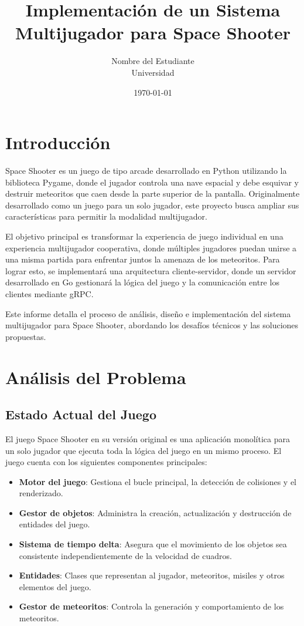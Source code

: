\documentclass[12pt,letterpaper]{article}
\title{\textbf{Implementación de un Sistema Multijugador para Space Shooter}}
\author{Nombre del Estudiante \\ Universidad}
\date{\today}
\begin{document}
\maketitle

\tableofcontents
\newpage

\section{Introducción}

Space Shooter es un juego de tipo arcade desarrollado en Python utilizando la biblioteca Pygame, donde el jugador controla una nave espacial y debe esquivar y destruir meteoritos que caen desde la parte superior de la pantalla. Originalmente desarrollado como un juego para un solo jugador, este proyecto busca ampliar sus características para permitir la modalidad multijugador.

El objetivo principal es transformar la experiencia de juego individual en una experiencia multijugador cooperativa, donde múltiples jugadores puedan unirse a una misma partida para enfrentar juntos la amenaza de los meteoritos. Para lograr esto, se implementará una arquitectura cliente-servidor, donde un servidor desarrollado en Go gestionará la lógica del juego y la comunicación entre los clientes mediante gRPC.

Este informe detalla el proceso de análisis, diseño e implementación del sistema multijugador para Space Shooter, abordando los desafíos técnicos y las soluciones propuestas.

\section{Análisis del Problema}

\subsection{Estado Actual del Juego}

El juego Space Shooter en su versión original es una aplicación monolítica para un solo jugador que ejecuta toda la lógica del juego en un mismo proceso. El juego cuenta con los siguientes componentes principales:

\begin{itemize}
    \item \textbf{Motor del juego}: Gestiona el bucle principal, la detección de colisiones y el renderizado.
    \item \textbf{Gestor de objetos}: Administra la creación, actualización y destrucción de entidades del juego.
    \item \textbf{Sistema de tiempo delta}: Asegura que el movimiento de los objetos sea consistente independientemente de la velocidad de cuadros.
    \item \textbf{Entidades}: Clases que representan al jugador, meteoritos, misiles y otros elementos del juego.
    \item \textbf{Gestor de meteoritos}: Controla la generación y comportamiento de los meteoritos.
\end{itemize}
\end{document}
